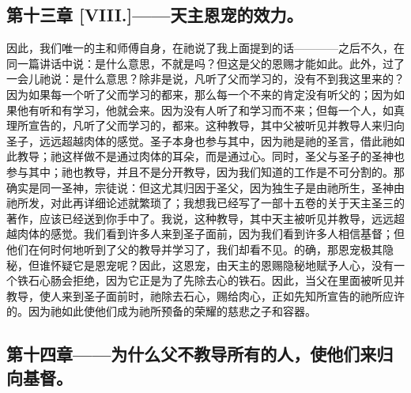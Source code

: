 
\subsection{第十三章 [VIII.]——天主恩宠的效力。}

因此，我们唯一的主和师傅自身，在祂说了我上面提到的话————之后不久，在同一篇讲话中说：是什么意思，不就是吗？但这是父的恩赐才能如此。此外，过了一会儿祂说：是什么意思？除非是说，凡听了父而学习的，没有不到我这里来的？因为如果每一个听了父而学习的都来，那么每一个不来的肯定没有听父的；因为如果他有听和有学习，他就会来。因为没有人听了和学习而不来；但每一个人，如真理所宣告的，凡听了父而学习的，都来。这种教导，其中父被听见并教导人来归向圣子，远远超越肉体的感觉。圣子本身也参与其中，因为祂是祂的圣言，借此祂如此教导；祂这样做不是通过肉体的耳朵，而是通过心。同时，圣父与圣子的圣神也参与其中；祂也教导，并且不是分开教导，因为我们知道的工作是不可分割的。那确实是同一圣神，宗徒说：但这尤其归因于圣父，因为独生子是由祂所生，圣神由祂所发，对此再详细论述就繁琐了；我想我已经写了一部十五卷的关于天主圣三的著作，应该已经送到你手中了。我说，这种教导，其中天主被听见并教导，远远超越肉体的感觉。我们看到许多人来到圣子面前，因为我们看到许多人相信基督；但他们在何时何地听到了父的教导并学习了，我们却看不见。的确，那恩宠极其隐秘，但谁怀疑它是恩宠呢？因此，这恩宠，由天主的恩赐隐秘地赋予人心，没有一个铁石心肠会拒绝，因为它正是为了先除去心的铁石。因此，当父在里面被听见并教导，使人来到圣子面前时，祂除去石心，赐给肉心，正如先知所宣告的祂所应许的。因为祂如此使他们成为祂所预备的荣耀的慈悲之子和容器。\par


\subsection{第十四章——为什么父不教导所有的人，使他们来归向基督。}

